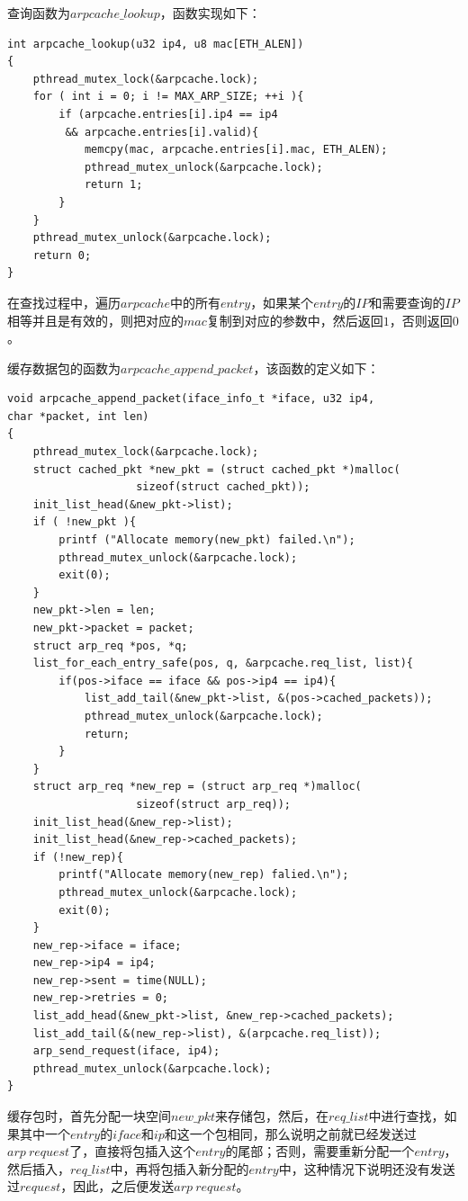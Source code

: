 \documentclass[UTF8,noindent]{ctexart}
\begin{document}
查询函数为$arpcache\_lookup$，函数实现如下：
\begin{lstlisting}
int arpcache_lookup(u32 ip4, u8 mac[ETH_ALEN])
{
	pthread_mutex_lock(&arpcache.lock);
	for ( int i = 0; i != MAX_ARP_SIZE; ++i ){
		if (arpcache.entries[i].ip4 == ip4 
		 && arpcache.entries[i].valid){
			memcpy(mac, arpcache.entries[i].mac, ETH_ALEN);
			pthread_mutex_unlock(&arpcache.lock);
			return 1;
		}
	}
	pthread_mutex_unlock(&arpcache.lock);
	return 0;
}
\end{lstlisting}
在查找过程中，遍历$arpcache$中的所有$entry$，如果某个$entry$的$IP$和需要查询的$IP$相等并且是有效的，则把对应的$mac$复制到对应的参数中，然后返回$1$，否则返回$0$。

缓存数据包的函数为$arpcache\_append\_packet$，该函数的定义如下：
\begin{lstlisting}
void arpcache_append_packet(iface_info_t *iface, u32 ip4,
char *packet, int len)
{
	pthread_mutex_lock(&arpcache.lock);
	struct cached_pkt *new_pkt = (struct cached_pkt *)malloc(
					sizeof(struct cached_pkt));
	init_list_head(&new_pkt->list);
	if ( !new_pkt ){
		printf ("Allocate memory(new_pkt) failed.\n");
		pthread_mutex_unlock(&arpcache.lock);
		exit(0);
	}
	new_pkt->len = len;
	new_pkt->packet = packet;
	struct arp_req *pos, *q;
	list_for_each_entry_safe(pos, q, &arpcache.req_list, list){
		if(pos->iface == iface && pos->ip4 == ip4){
			list_add_tail(&new_pkt->list, &(pos->cached_packets));
			pthread_mutex_unlock(&arpcache.lock);
			return;
		}
	}
	struct arp_req *new_rep = (struct arp_req *)malloc(
					sizeof(struct arp_req));
	init_list_head(&new_rep->list);
	init_list_head(&new_rep->cached_packets);
	if (!new_rep){
		printf("Allocate memory(new_rep) falied.\n");
		pthread_mutex_unlock(&arpcache.lock);
		exit(0);
	}
	new_rep->iface = iface;
	new_rep->ip4 = ip4;
	new_rep->sent = time(NULL);
	new_rep->retries = 0;
	list_add_head(&new_pkt->list, &new_rep->cached_packets);
	list_add_tail(&(new_rep->list), &(arpcache.req_list));
	arp_send_request(iface, ip4);
	pthread_mutex_unlock(&arpcache.lock);
}
\end{lstlisting}
缓存包时，首先分配一块空间$new\_pkt$来存储包，然后，在$req\_list$中进行查找，如果其中一个$entry$的$iface$和$ip$和这一个包相同，那么说明之前就已经发送过$arp\ request$了，直接将包插入这个$entry$的尾部；否则，需要重新分配一个$entry$，然后插入，$req\_list$中，再将包插入新分配的$entry$中，这种情况下说明还没有发送过$request$，因此，之后便发送$arp\ request$。
\end{document}
